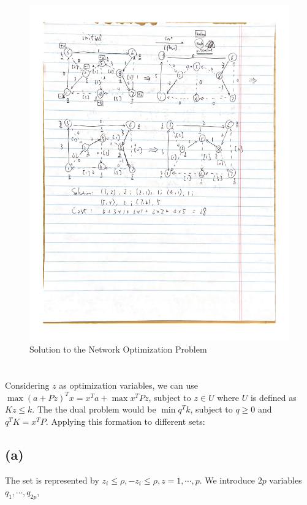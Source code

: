 \documentclass{article}
\newcommand{\1}{\bm 1}
\begin{document}
\begin{figure}
    \centering
    \includegraphics[width=\textwidth]{1.png}
    \caption{Solution to the Network Optimization Problem}
\end{figure}

\section{}

Considering $z$ as optimization variables, we can use $\max (a+Pz)^Tx=x^Ta+\max x^TPz$, subject to $z\in U$ where $U$ is defined as $Kz\le k$. The the dual problem would be $\min q^Tk$, subject to $q\ge0$ and $q^TK=x^TP$. Applying this formation to different sets:

\subsection*{(a)}

The set is represented by $z_i\le\rho,-z_i\le\rho,z=1,\cdots,p$. We introduce $2p$ variables $q_1,\cdots,q_{2p}$,
\end{document}
